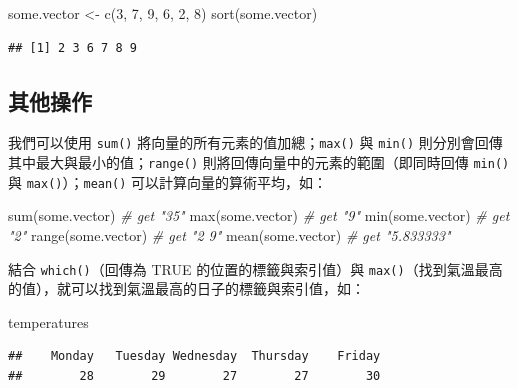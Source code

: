 \documentclass[
]{book}
\newenvironment{Shaded}{\begin{snugshade}}{\end{snugshade}}
\newcommand{\CommentTok}[1]{\textcolor[rgb]{0.56,0.35,0.01}{\textit{#1}}}
\newcommand{\DecValTok}[1]{\textcolor[rgb]{0.00,0.00,0.81}{#1}}
\newcommand{\FunctionTok}[1]{\textcolor[rgb]{0.00,0.00,0.00}{#1}}
\newcommand{\NormalTok}[1]{#1}
\newcommand{\OtherTok}[1]{\textcolor[rgb]{0.56,0.35,0.01}{#1}}
\theoremstyle{definition}
\theoremstyle{remark}
\begin{document}
\begin{Shaded}
\begin{Highlighting}[]
\NormalTok{some.vector }\OtherTok{\textless{}{-}} \FunctionTok{c}\NormalTok{(}\DecValTok{3}\NormalTok{, }\DecValTok{7}\NormalTok{, }\DecValTok{9}\NormalTok{, }\DecValTok{6}\NormalTok{, }\DecValTok{2}\NormalTok{, }\DecValTok{8}\NormalTok{)}
\FunctionTok{sort}\NormalTok{(some.vector)}
\end{Highlighting}
\end{Shaded}

\begin{verbatim}
## [1] 2 3 6 7 8 9
\end{verbatim}

\hypertarget{ux5176ux4ed6ux64cdux4f5c}{%
\subsection{其他操作}\label{ux5176ux4ed6ux64cdux4f5c}}

我們可以使用 \texttt{sum()} 將向量的所有元素的值加總；\texttt{max()} 與 \texttt{min()} 則分別會回傳其中最大與最小的值；\texttt{range()} 則將回傳向量中的元素的範圍（即同時回傳 \texttt{min()} 與 \texttt{max()}）；\texttt{mean()} 可以計算向量的算術平均，如：

\begin{Shaded}
\begin{Highlighting}[]
\FunctionTok{sum}\NormalTok{(some.vector)  }\CommentTok{\# get "35"}
\FunctionTok{max}\NormalTok{(some.vector)  }\CommentTok{\# get "9"}
\FunctionTok{min}\NormalTok{(some.vector)  }\CommentTok{\# get "2"}
\FunctionTok{range}\NormalTok{(some.vector)  }\CommentTok{\# get "2 9"}
\FunctionTok{mean}\NormalTok{(some.vector)  }\CommentTok{\# get "5.833333"}
\end{Highlighting}
\end{Shaded}

結合 \texttt{which()}（回傳為 TRUE 的位置的標籤與索引值）與 \texttt{max()}（找到氣溫最高的值），就可以找到氣溫最高的日子的標籤與索引值，如：

\begin{Shaded}
\begin{Highlighting}[]
\NormalTok{temperatures}
\end{Highlighting}
\end{Shaded}

\begin{verbatim}
##    Monday   Tuesday Wednesday  Thursday    Friday 
##        28        29        27        27        30
\end{verbatim}
\end{document}
